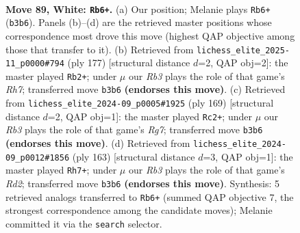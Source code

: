 \documentclass[11pt]{article}
\begin{document}
\clearpage

\begin{figure}[p]\centering
\begin{subfigure}{0.46\textwidth}\centering
\resizebox{\linewidth}{!}{%
\newchessgame
\chessboard[
  setfen={8/8/k7/5K2/2N5/1R6/6P1/3r4 w - - 42 89},
  showmover=false,
  pgfstyle=straightmove, color=movearrow, markmove={b3-b6}
]}
\caption{}
\end{subfigure}\hfill
\begin{subfigure}{0.46\textwidth}\centering
\resizebox{\linewidth}{!}{%
\newchessgame
\chessboard[
  setfen={4R3/8/8/8/8/3n1k2/7r/1K6 b - - 9 89},
  showmover=false,
  pgfstyle=straightmove, color=movearrow, markmove={h2-b2}
]}
\caption{}
\end{subfigure}
\\[4pt]
\begin{subfigure}{0.46\textwidth}\centering
\resizebox{\linewidth}{!}{%
\newchessgame
\chessboard[
  setfen={4R3/8/5k2/8/3n4/8/6r1/2K5 b - - 57 85},
  showmover=false,
  pgfstyle=straightmove, color=movearrow, markmove={g2-c2}
]}
\caption{}
\end{subfigure}\hfill
\begin{subfigure}{0.46\textwidth}\centering
\resizebox{\linewidth}{!}{%
\newchessgame
\chessboard[
  setfen={6k1/3r4/7K/8/8/6p1/8/R7 b - - 1 82},
  showmover=false,
  pgfstyle=straightmove, color=movearrow, markmove={d7-h7}
]}
\caption{}
\end{subfigure}
\caption{\textbf{Move 89, White: \texttt{Rb6+}.} (a) Our position; Melanie plays \texttt{Rb6+} (\texttt{b3b6}). Panels (b)--(d) are the retrieved master positions whose correspondence most drove this move (highest QAP objective among those that transfer to it). (b) Retrieved from \texttt{lichess\_elite\_2025-11\_p0000\#794} (ply 177) [structural distance $d$=2, QAP obj=2]: the master played \texttt{Rb2+}; under $\mu$ our \emph{Rb3} plays the role of that game's \emph{Rh7}; transferred move \texttt{b3b6} \textbf{(endorses this move)}. (c) Retrieved from \texttt{lichess\_elite\_2024-09\_p0005\#1925} (ply 169) [structural distance $d$=2, QAP obj=1]: the master played \texttt{Rc2+}; under $\mu$ our \emph{Rb3} plays the role of that game's \emph{Rg7}; transferred move \texttt{b3b6} \textbf{(endorses this move)}. (d) Retrieved from \texttt{lichess\_elite\_2024-09\_p0012\#1856} (ply 163) [structural distance $d$=3, QAP obj=1]: the master played \texttt{Rh7+}; under $\mu$ our \emph{Rb3} plays the role of that game's \emph{Rd2}; transferred move \texttt{b3b6} \textbf{(endorses this move)}. Synthesis: 5 retrieved analogs transferred to \texttt{Rb6+} (summed QAP objective 7, the strongest correspondence among the candidate moves); Melanie committed it via the \texttt{search} selector.}
\label{fig:thought-m176}
\end{figure}
\end{document}
